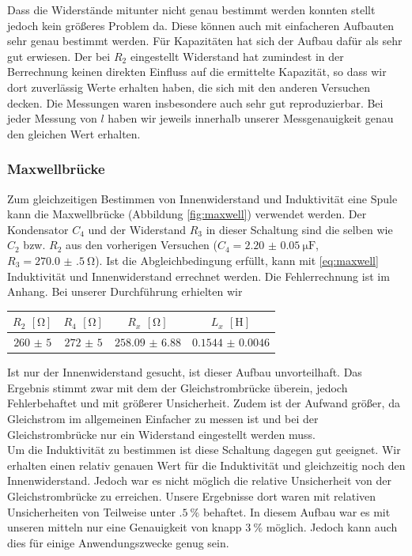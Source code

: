 Dass die Widerstände mitunter nicht genau bestimmt werden konnten stellt jedoch kein größeres Problem da. Diese können auch mit einfacheren Aufbauten sehr genau bestimmt werden. Für Kapazitäten hat sich der Aufbau dafür als sehr gut erwiesen. Der bei $ R_2 $ eingestellt Widerstand hat zumindest in der Berrechnung keinen direkten Einfluss auf die ermittelte Kapazität, so dass wir dort zuverlässig Werte erhalten haben, die sich mit den anderen Versuchen decken. Die Messungen waren insbesondere auch sehr gut reproduzierbar. Bei jeder Messung von $ l $ haben wir jeweils innerhalb unserer Messgenauigkeit genau den gleichen Wert erhalten. 

\subsubsection{Maxwellbrücke}
Zum gleichzeitigen Bestimmen von Innenwiderstand und Induktivität eine Spule kann die Maxwellbrücke (Abbildung \ref{fig:maxwell}) verwendet werden. Der Kondensator $ C_4 $ und der Widerstand $ R_3 $ in dieser Schaltung sind die selben wie $ C_2 $ bzw. $ R_2 $ aus den vorherigen Versuchen ($ C_4 =  \SI{2.20(5)}{\micro\farad} $, $ R_3 = \SI{270.0(5)}{\ohm} $). Ist die Abgleichbedingung erfüllt, kann mit \eqref{eq:maxwell} Induktivität und Innenwiderstand errechnet werden. Die Fehlerrechnung ist im Anhang. Bei unserer Durchführung erhielten wir
\begin{table}[H]
	\centering
	\begin{tabular}{cccc}
		$ R_2 $ $ [\si{\ohm}] $ & $ R_4 $ $ [\si{\ohm}] $ & $ R_x $ $ [\si{\ohm}] $ & $ L_x $ $ [\si{\henry}] $ \\ \hline
		$ \num{260(5)} $ & $ \num{272(5)} $ & $ \num{258.09(688)} $ & $ \num{0.1544(00046)} $
	\end{tabular}
\end{table}
Ist nur der Innenwiderstand gesucht, ist dieser Aufbau unvorteilhaft. Das Ergebnis stimmt zwar mit dem der Gleichstrombrücke überein, jedoch Fehlerbehaftet und mit größerer Unsicherheit. Zudem ist der Aufwand größer, da Gleichstrom im allgemeinen Einfacher zu messen ist und bei der Gleichstrombrücke nur ein Widerstand eingestellt werden muss. \\
Um die Induktivität zu bestimmen ist diese Schaltung dagegen gut geeignet. Wir erhalten einen relativ genauen Wert für die Induktivität und gleichzeitig noch den Innenwiderstand. Jedoch war es nicht möglich die relative Unsicherheit von der Gleichstrombrücke zu erreichen. Unsere Ergebnisse dort waren mit relativen Unsicherheiten von Teilweise unter $ \SI{.5}{\percent} $ behaftet. In diesem Aufbau war es mit unseren mitteln nur eine Genauigkeit von knapp $ \SI{3}{\percent} $ möglich. Jedoch kann auch dies für einige Anwendungszwecke genug sein.

